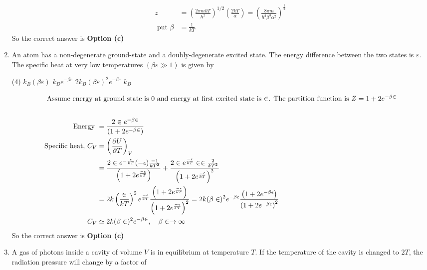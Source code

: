 \begin{enumerate}
\begin{answer}
\begin{align*}
	z&=\left(\frac{2 \pi m k T}{h^{2}}\right)^{1 / 2}\left(\frac{2 k T}{\alpha}\right)=\left(\frac{8 \pi m}{h^{2} \beta^{3} \alpha^{2}}\right)^{\frac{1}{2}}\\
	\text{ put }\beta&=\frac{1}{k T}
	\end{align*}
	So the correct answer is \textbf{Option (c)}
\end{answer}
	\item An atom has a non-degenerate ground-state and a doubly-degenerate excited state. The energy difference between the two states is $\varepsilon$. The specific heat at very low temperatures $(\beta \varepsilon \gg 1)$ is given by
	{}
	\begin{tasks}(4)
		\task[\textbf{a.}] $k_{B}(\beta \varepsilon)$
		\task[\textbf{b.}] $k_{B} e^{-\beta \varepsilon}$
		\task[\textbf{c.}] $2 k_{B}(\beta \varepsilon)^{2} e^{-\beta \varepsilon}$
		\task[\textbf{d.}] $k_{B}$
	\end{tasks}
\begin{answer}
	\begin{align*}
	\intertext{ Assume energy at ground state is 0 and energy at first excited state is $\in$. The partition function is $Z=1+2 e^{-\beta \in}$}\\
	\text{Energy }&=\frac{2 \in e^{-\beta \in}}{\left(1+2 e^{-\beta \in}\right)}\\
	\text{Specific heat, }C_{V}&=\left(\frac{\partial U}{\partial T}\right)_{V}\\&=\frac{2 \in e^{-\frac{\epsilon}{k T}}(-\epsilon) \frac{-1}{k T^{2}}}{\left(1+2 e^{\frac{-\epsilon}{k T}}\right)}+\frac{2 \in e^{\frac{-\epsilon}{k T}} \in \in \frac{2}{k T^{2}}}{\left(1+2 e^{\frac{-\epsilon}{k T}}\right)^{2}}\\
	&=2 k\left(\frac{\in}{k T}\right)^{2} e^{\frac{-\epsilon}{k T}} \frac{\left(1+2 e^{\frac{-\epsilon}{k T}}\right)}{\left(1+2 e^{\frac{-\epsilon}{k T}}\right)^{2}}=2 k(\beta \in)^{2} e^{-\beta \epsilon} \frac{\left(1+2 e^{-\beta \epsilon}\right)}{\left(1+2 e^{-\beta \epsilon}\right)^{2}}\\
	C_{V} &\simeq 2 k(\beta \in)^{2} e^{-\beta \in}, \quad \beta \in \rightarrow \infty
	\end{align*}
	So the correct answer is \textbf{Option (c)}
\end{answer}
	\item  A gas of photons inside a cavity of volume $V$ is in equilibrium at temperature $T$. If the temperature of the cavity is changed to $2 T$, the radiation pressure will change by a factor of

\end{enumerate}
